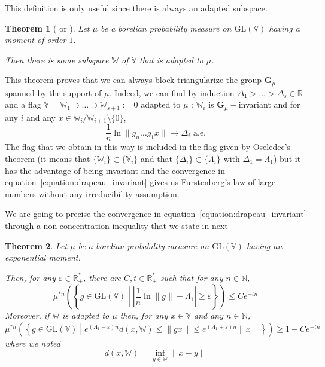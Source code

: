 \documentclass[11pt]{amsart}
\newtheorem{theorem}{Theorem}[section]
\theoremstyle{definition}
\theoremstyle{remark}
\numberwithin{equation}{section}
\begin{document}
This definition is only useful since there is always an adapted subspace.

\begin{theorem}[\cite{FK83} or \cite{Hen84}] \label{theorem:FKH}
Let $\mu$ be a borelian probability measure on $\mathrm{GL}({\mathbb V})$ having a moment of order $1$.

Then there is some subspace ${\mathbb W}$ of ${\mathbb V}$ that is adapted to $\mu$.
\end{theorem}

This theorem proves that we can always block-triangularize the group ${\mathbf G}_\mu$ spanned by the support of $\mu$. Indeed, we can find by induction $\Delta_1>\dots >\Delta_s \in {\mathbb R}$ and a flag ${\mathbb V}={\mathbb W}_1 \supset \dots \supset {\mathbb W}_{s+1}:=0$ adapted to $\mu$ : ${\mathbb W}_i$ is ${\mathbf G}_\mu-$invariant and for any $i$ and any $x\in {\mathbb W}_i / {\mathbb W}_{i+1} \setminus\{0\}$,
\begin{equation} \label{equation:drapeau_invariant}
\frac 1n \ln \|g_n \dots g_1 x\| \xrightarrow\, \Delta_i \text{ a.e.}
\end{equation}
The flag that we obtain in this way is included in the flag given by Oseledec's theorem (it means that $\{{\mathbb W}_i\} \subset \{{\mathbb V}_i\}$ and that $\{\Delta_i\} \subset \{\Lambda_i\}$ with $\Delta_1 = \Lambda_1$) but it has the advantage of being invariant and the convergence in equation~\eqref{equation:drapeau_invariant} gives us Furstenberg's law of large numbers without any irreducibility assumption.

\medskip
We are going to precise the convergence in equation~\eqref{equation:drapeau_invariant} through a non-concentration inequality that we state in next
\begin{theorem} \label{theoreme:LDP_produits_reductible}
Let $\mu$ be a borelian probability measure on $\mathrm{GL}({\mathbb V})$ having an exponential moment.

Then, for any $\varepsilon \in {\mathbb R}_+^\ast$, there are $C,t\in {\mathbb R}_+^\ast$ such that for any $n\in {\mathbb N}$,
\[
\mu^{\ast n} \left( \left\{ g \in \mathrm{GL}({\mathbb V})\middle| \left| \frac 1 n \ln \|g\| - \Lambda_1 \right| \geqslant \varepsilon\right\}\right) \leqslant Ce^{-tn}
\]
Moreover, if ${\mathbb W}$ is adapted to $\mu$ then, for any $x\in {\mathbb V}$ and any $n\in {\mathbb N}$,
\[
\mu^{\ast n} \left(\left\{ g\in \mathrm{GL}({\mathbb V})\middle|  e^{(\Lambda_1 - \varepsilon)n} d(x,{\mathbb W}) \leqslant \|gx\| \leqslant e^{(\Lambda_1 + \varepsilon)n} \|x\| \right\}\right) \geqslant 1- Ce^{-tn}
\]
where we noted
\[
d(x,{\mathbb W}) = \inf_{y\in {\mathbb W}} \|x-y\|
\]
\end{theorem}
\end{document}
